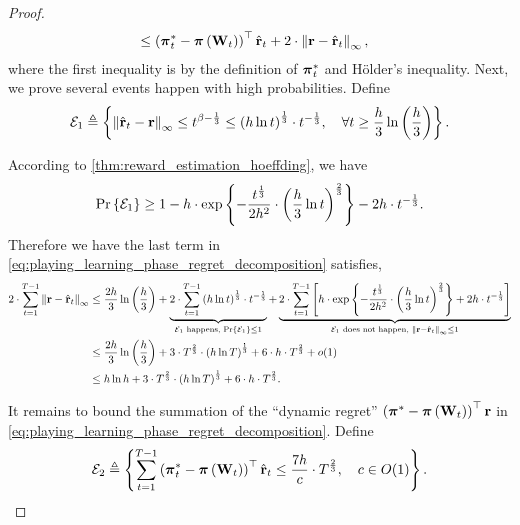 \begin{proof}
\begin{equation}
\begin{split}
    &\le \left( {{\boldsymbol{\pi}}_t^*} - {\boldsymbol{\pi}}\left( {\mathbf{W}}_t \right) \right)^\top \hat{{\mathbf{r}}}_t  + 2 \cdot \left\| {\mathbf{r}} - \hat{{\mathbf{r}}}_t \right\|_\infty,
\end{split}
\end{equation}
where the first inequality is by the definition of ${\boldsymbol{\pi}}_t^*$ and  H{\"o}lder's inequality. Next, we prove several events happen with high probabilities. Define
\begin{equation*}
    {\mathcal{E}}_1 \triangleq \left\{ \left\| \hat{{\mathbf{r}}}_t - {\mathbf{r}} \right\|_\infty \le t^{\beta - \frac{1}{3}} \le \left( h \ln{t} \right) ^\frac{1}{3} \cdot t^{- \frac{1}{3}}, \quad \forall t \ge \frac{h}{3} \ln{\left(\frac{h}{3}\right) } \right\}.
\end{equation*}

According to \cref{thm:reward_estimation_hoeffding}, we have 
\begin{equation*}
    {\text{Pr}}\left\{ {\mathcal{E}}_1 \right\} \ge
    1 - h \cdot \exp\left\{ - \frac{t^{\frac{1}{3}}}{2 h^2} \cdot \left( \frac{h}{3} \ln{t} \right)^{\frac{2}{3}} \right\} - 2 h \cdot t^{- \frac{1}{3}}.
\end{equation*}
Therefore we have the last term in \cref{eq:playing_learning_phase_regret_decomposition} satisfies,
\begin{equation}
\label{eq:estimation_upper_bound}
\begin{split}
    2 \cdot \sum\limits_{t=1}^{T-1}{ \left\| {\mathbf{r}} - \hat{{\mathbf{r}}}_t \right\|_\infty } &\le \frac{2 h}{3} \ln{\left(\frac{h}{3}\right) } + \underbrace{2 \cdot \sum\limits_{t=1}^{T-1}{ \left( h \ln{t} \right) ^\frac{1}{3} \cdot t^{- \frac{1}{3}} }}_{{\mathcal{E}}_1 \text{ happens, } {\text{Pr}}\left\{ {\mathcal{E}}_1 \right\} \le 1} + \underbrace{ 2 \cdot  \sum\limits_{t=1}^{T-1}{ \left[ h \cdot \exp\left\{ - \frac{t^{\frac{1}{3}}}{2 h^2} \cdot \left( \frac{h}{3} \ln{t} \right)^{\frac{2}{3}} \right\} + 2 h \cdot t^{- \frac{1}{3}} \right] } }_{ {\mathcal{E}}_1 \text{ does not happen, } \left\| {\mathbf{r}} - \hat{{\mathbf{r}}}_t \right\|_\infty \le 1 } \\
    &\le \frac{2 h}{3} \ln{\left(\frac{h}{3}\right) } + 3 \cdot T^{\frac{2}{3}} \cdot \left( h \ln{T} \right) ^\frac{1}{3} + 6 \cdot h \cdot T^{\frac{2}{3}} + o(1) \\
    &\le h \ln{h} + 3 \cdot T^{\frac{2}{3}} \cdot \left( h \ln{T} \right) ^\frac{1}{3} + 6 \cdot h \cdot T^{\frac{2}{3}}.
\end{split}
\end{equation}

It remains to bound the summation of the ``dynamic regret'' $\left( {{\boldsymbol{\pi}}^*} - {\boldsymbol{\pi}}\left( {\mathbf{W}}_t \right) \right)^\top {\mathbf{r}}$ in \cref{eq:playing_learning_phase_regret_decomposition}. Define
\begin{equation*}
    {\mathcal{E}}_2 \triangleq \left\{ \sum\limits_{t=1}^{T-1}{ \left(  {{\boldsymbol{\pi}}_t^*} - {\boldsymbol{\pi}}\left( {\mathbf{W}}_t \right) \right)^\top \hat{{\mathbf{r}}}_t } \le \frac{7 h}{c} \cdot  T^{\frac{2}{3}}, \quad c \in O(1) \right\}.
\end{equation*}


\end{proof}
